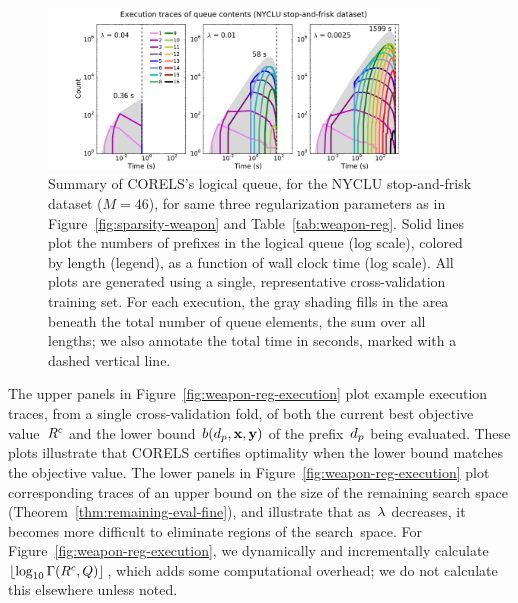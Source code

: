\begin{figure}[t!]
\begin{center}
\includegraphics[trim={30mm 0mm 30mm 3mm},
width=0.92\textwidth]{figs/weapon_reg-queue.pdf}
\end{center}
\vspace{-5mm}
\caption{Summary of CORELS's logical queue,
for the NYCLU stop-and-frisk dataset (${M = 46}$),
for same three regularization parameters as in Figure~\ref{fig:sparsity-weapon}
and Table~\ref{tab:weapon-reg}.
%
Solid lines plot the numbers of prefixes in the logical queue (log scale), colored by length (legend),
as a function of wall clock time (log scale).
%
All plots are generated using a single, representative cross-validation training set.
%
For each execution, the gray shading fills in the area beneath the total number
of queue elements, \ie the sum over all lengths;
we also annotate the total time in seconds, marked with a dashed vertical line.
}
\label{fig:queue-weapon-reg}
\end{figure}

The upper panels in Figure~\ref{fig:weapon-reg-execution} plot example execution traces,
from a single cross-validation fold, of both the current best objective value~${R^c}$
and the lower bound~$b(d_p, \mathbf{x}, \mathbf{y})$ of the prefix~$d_p$ being evaluated.
%
These plots illustrate that CORELS certifies optimality
when the lower bound matches the objective value.
%
The lower panels in Figure~\ref{fig:weapon-reg-execution} plot corresponding traces of
an upper bound on the size of the remaining search space (Theorem~\ref{thm:remaining-eval-fine}),
and illustrate that as~${\lambda}$ decreases, it becomes more difficult to eliminate regions of the search~space.
%
For Figure~\ref{fig:weapon-reg-execution}, we dynamically and incrementally
calculate~$\lfloor \log_{10} \Gamma({R^c}, Q) \rfloor$,
which adds some computational overhead; we do not calculate this elsewhere unless noted.

